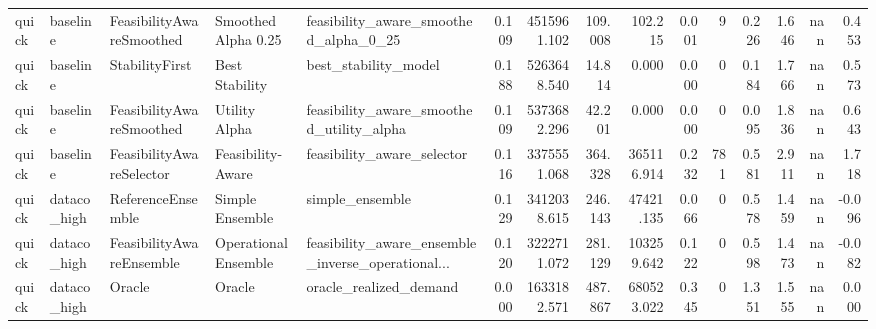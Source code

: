 \begin{table}
{\begin{tabular}{lllllrrrrrrrrrr}
   quick &       baseline &  FeasibilityAwareSmoothed &   Smoothed Alpha 0.25 &              feasibility\_aware\_smoothed\_alpha\_0\_25 & 0.109 &     4515961.102 &              109.008 &            102.215 &                     0.001 &                   9 &                       0.226 &                  1.646 &               nan &                  0.453 \\
   quick &       baseline &            StabilityFirst &        Best Stability &                               best\_stability\_model & 0.188 &     5263648.540 &               14.814 &              0.000 &                     0.000 &                   0 &                       0.184 &                  1.766 &               nan &                  0.573 \\
   quick &       baseline &  FeasibilityAwareSmoothed &         Utility Alpha &           feasibility\_aware\_smoothed\_utility\_alpha & 0.109 &     5373682.296 &               42.201 &              0.000 &                     0.000 &                   0 &                       0.095 &                  1.836 &               nan &                  0.643 \\
   quick &       baseline &  FeasibilityAwareSelector &     Feasibility-Aware &                         feasibility\_aware\_selector & 0.116 &     3375551.068 &              364.328 &         365116.914 &                     0.232 &                 781 &                       0.581 &                  2.911 &               nan &                  1.718 \\
   quick &    dataco\_high &         ReferenceEnsemble &       Simple Ensemble &                                    simple\_ensemble & 0.129 &     3412038.615 &              246.143 &          47421.135 &                     0.066 &                   0 &                       0.578 &                  1.459 &               nan &                 -0.096 \\
   quick &    dataco\_high &  FeasibilityAwareEnsemble &  Operational Ensemble &  feasibility\_aware\_ensemble\_inverse\_operational... & 0.120 &     3222711.072 &              281.129 &         103259.642 &                     0.122 &                   0 &                       0.598 &                  1.473 &               nan &                 -0.082 \\
   quick &    dataco\_high &                    Oracle &                Oracle &                             oracle\_realized\_demand & 0.000 &     1633182.571 &              487.867 &         680523.022 &                     0.345 &                   0 &                       1.351 &                  1.555 &               nan &                  0.000 \\

\end{tabular}}
\end{table}
